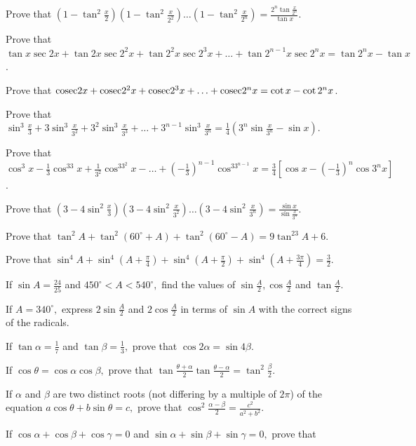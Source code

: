 \item Prove that $\left(1 - \tan^2\frac{x}{2}\right)\left(1 - \tan^2\frac{x}{2^2}\right)\ldots\left(1 -
  \tan^2\frac{x}{2^n}\right) = \frac{2^n\tan\frac{x}{2^n}}{\tan x}$.
\item Prove that $\tan x\sec2x + \tan2x\sec2^2x + \tan2^2x\sec2^3x + \ldots + \tan2^{n - 1}x\sec2^nx = \tan2^nx - \tan x$.
\item Prove that ${\rm cosec} 2x + {\rm cosec} 2^2x + {\rm cosec} 2^3x + \ldots + {\rm cosec} 2^nx = \cot x - \cot2^nx$.
\item Prove that $\sin^3\frac{x}{3} + 3\sin^3\frac{x}{3^2} + 3^2\sin^3\frac{x}{3^3} + \ldots + 3^{n - 1}\sin^3\frac{x}{3^n} =
  \frac{1}{4}\left(3^n\sin\frac{x}{3^n} - \sin x\right)$.
\item Prove that $\cos^3x - \frac{1}{3}\cos^33x + \frac{1}{3^2}\cos^33^2x - \ldots + \left(-\frac{1}{3}\right)^{n -
  1}\cos^33^{n - 1}x = \frac{3}{4}\left[\cos x - \left(-\frac{1}{3}\right)^n\cos3^nx\right]$.
\item Prove that $\left(3 - 4\sin^2\frac{x}{3}\right)\left(3 - 4\sin^2\frac{x}{3^2}\right)\ldots\left(3 -
  4\sin^2\frac{x}{3^n}\right) = \frac{\sin x}{\sin\frac{x}{3^n}}$.
\item Prove that $\tan^2A + \tan^2(60^\circ + A) + \tan^2(60^\circ - A) = 9\tan^23A + 6$.
\item Prove that $\sin^4A + \sin^4\left(A + \frac{\pi}{4}\right) + \sin^4\left(A + \frac{\pi}{2}\right) + \sin^4\left(A +
  \frac{3\pi}{4}\right) = \frac{3}{2}$.
\item If $\sin A = \frac{24}{25}$ and $450^\circ < A < 540^\circ,$ find the values of $\sin\frac{A}{2}, \cos\frac{A}{2}$ and
  $\tan\frac{A}{2}$.
\item If $A = 340^\circ,$ express $2\sin\frac{A}{2}$ and $2\cos\frac{A}{2}$ in terms of $\sin A$ with the correct signs of
  the radicals.
\item If $\tan\alpha = \frac{1}{7}$ and $\tan\beta = \frac{1}{3},$ prove that $\cos2\alpha = \sin4\beta$.
\item If $\cos\theta = \cos\alpha\cos\beta,$ prove that $\tan\frac{\theta + \alpha}{2}\tan\frac{\theta - \alpha}{2} =
  \tan^2\frac{\beta}{2}$.
\item If $\alpha$ and $\beta$ are two distinct roots (not differing by a multiple of $2\pi$) of the equation $a\cos\theta +
  b\sin\theta = c,$ prove that $\cos^2\frac{\alpha - \beta}{2} = \frac{c^2}{a^2 + b^2}$.
\item If $\cos\alpha + \cos\beta + \cos\gamma = 0$ and $\sin\alpha + \sin\beta + \sin\gamma = 0,$ prove that
